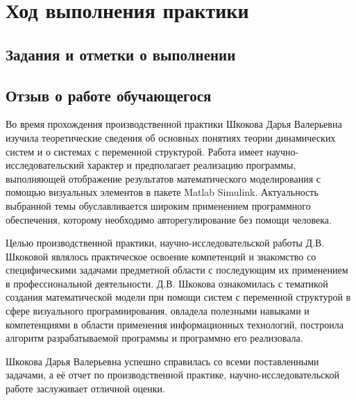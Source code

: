 \chapter*{Ход выполнения практики}

\section*{Задания и отметки о выполнении}







\clearpage
\section*{Отзыв о работе обучающегося}

Во время прохождения производственной практики Шкокова Дарья Валерьевна изучила теоретические сведения об основных понятиях теории динамических систем и о системах с переменной структурой. Работа имеет научно-исследовательский характер и предполагает реализацию программы, выполняющей отображение результатов математического моделирования с помощью визуальных элементов в пакете Matlab Simulink. Актуальность выбранной темы обуславливается широким применением программного обеспечения, которому необходимо авторегулирование без помощи человека.

Целью производственной практики, научно-исследовательской работы  Д.В. Шкоковой являлось практическое освоение компетенций и знакомство со специфическими задачами предметной области с последующим их применением в профессиональной деятельности. Д.В. Шкокова ознакомилась с тематикой создания математической модели при помощи систем с переменной структурой в сфере визуального програмиирования, овладела полезными навыками и компетенциями в области применения информационных технологий, построила алгоритм разрабатываемой программы и программно его реализовала.

Шкокова Дарья Валерьевна успешно справилась со всеми поставленными задачами, а её отчет по производственной практике, научно-исследовательской работе заслуживает отличной оценки.

\progressapprov
